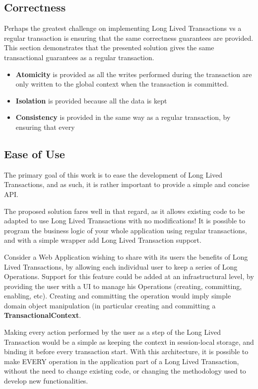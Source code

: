 \subsection{Correctness}

Perhaps the greatest challenge on implementing Long Lived Transactions
vs a regular transaction is ensuring that the same correctness
guarantees are provided. This section demonstrates that the presented
solution gives the same transactional guarantees as a regular transaction.

\begin{itemize}

\item {\bf Atomicity} is provided as all the writes performed during
  the transaction are only written to the global context when the
  transaction is committed.

\item {\bf Isolation} is provided because all the data is kept 

\item {\bf Consistency} is provided in the same way as a regular
  transaction, by ensuring that every

\end{itemize}

\subsection{Ease of Use}

The primary goal of this work is to ease the development of Long Lived
Transactions, and as such, it is rather important to provide a simple
and concise API.

The proposed solution fares well in that regard, as it allows existing
code to be adapted to use Long Lived Transactions with no
modifications! It is possible to program the business logic of your
whole application using regular transactions, and with a simple
wrapper add Long Lived Transaction support.

Consider a Web Application wishing to share with its users the
benefits of Long Lived Transactions, by allowing each individual user
to keep a series of Long Operations. Support for this feature could be
added at an infrastructural level, by providing the user with a UI to
manage his Operations (creating, committing, enabling, etc). Creating
and committing the operation would imply simple domain object
manipulation (in particular creating and committing a {\bf
  TransactionalContext}.

Making every action performed by the user as a step of the Long Lived
Transaction would be a simple as keeping the context in session-local
storage, and binding it before every transaction start. With this
architecture, it is possible to make EVERY operation in the
application part of a Long Lived Transaction, without the need to
change existing code, or changing the methodology used to develop new
functionalities. 
